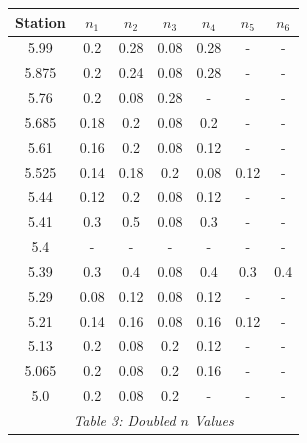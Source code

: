 \begin{center}
\begin{tabular}{|c|cccccc|} 
    \hline
    \textbf{Station} & $n_1$ & $n_2$ & $n_3$ & $n_4$ & $n_5$ & $n_6$  \\ 
    \hline
    5.99             & 0.2      & 0.28     & 0.08     & 0.28     & -        & -         \\
    5.875            & 0.2      & 0.24     & 0.08     & 0.28     & -        & -         \\
    5.76             & 0.2      & 0.08     & 0.28     & -        & -        & -         \\
    5.685            & 0.18     & 0.2      & 0.08     & 0.2      & -        & -         \\
    5.61             & 0.16     & 0.2      & 0.08     & 0.12     & -        & -         \\
    5.525            & 0.14     & 0.18     & 0.2      & 0.08     & 0.12     & -         \\
    5.44             & 0.12     & 0.2      & 0.08     & 0.12     & -        & -         \\
    5.41             & 0.3      & 0.5      & 0.08     & 0.3      & -        & -         \\
    5.4              & -        & -        & -        & -        & -        & -         \\
    5.39             & 0.3      & 0.4      & 0.08     & 0.4      & 0.3      & 0.4       \\
    5.29             & 0.08     & 0.12     & 0.08     & 0.12     & -        & -         \\
    5.21             & 0.14     & 0.16     & 0.08     & 0.16     & 0.12     & -         \\
    5.13             & 0.2      & 0.08     & 0.2      & 0.12     & -        & -         \\
    5.065            & 0.2      & 0.08     & 0.2      & 0.16     & -        & -         \\
    5.0              & 0.2      & 0.08     & 0.2      & -        & -        & -         \\
    \hline\multicolumn{7}{c}{\emph{Table 3: Doubled $n$ Values}}
\end{tabular}
\newpage


\end{center}
